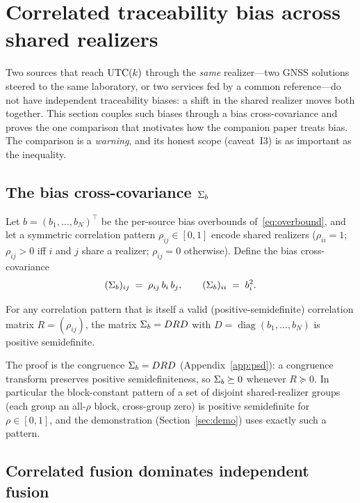 \section{Correlated traceability bias across shared realizers}
\label{sec:corr}

Two sources that reach $\mathrm{UTC}(k){}$ through the \emph{same} realizer---two GNSS
solutions steered to the same laboratory, or two services fed by a common
reference---do not have independent traceability biases: a shift in the shared
realizer moves both together. This section couples such biases through a bias
cross-covariance and proves the one comparison that motivates how the companion
paper treats bias. The comparison is a \emph{warning}, and its honest scope
(caveat~I3) is as important as the inequality.

\subsection{The bias cross-covariance $\Sigma_{b}{}$}
\label{sec:sigmab}

Let $b=(b_1,\dots,b_N)^{\!\top}$ be the per-source bias overbounds
of~\eqref{eq:overbound}, and let a symmetric correlation pattern
$\rho_{ij}\in[0,1]$ encode shared realizers ($\rho_{ii}=1$; $\rho_{ij}>0$ iff $i$
and $j$ share a realizer; $\rho_{ij}=0$ otherwise). Define the bias
cross-covariance
\begin{equation}
  (\Sigma_{b}{})_{ij} \;=\; \rho_{ij}\,b_i\,b_j,
  \qquad
  (\Sigma_{b}{})_{ii} \;=\; b_i^2 .
  \label{eq:sigmab}
\end{equation}

\begin{proposition}
\label{prop:psd}
For any correlation pattern that is itself a valid (positive-semidefinite)
correlation matrix $R=(\rho_{ij})$, the matrix $\Sigma_{b}{}=DRD$ with
$D=\operatorname{diag}(b_1,\dots,b_N)$ is positive semidefinite.
\end{proposition}

The proof is the congruence $\Sigma_{b}{}=DRD$ (Appendix~\ref{app:psd}): a congruence
transform preserves positive semidefiniteness, so $\Sigma_{b}{}\succeq0$ whenever
$R\succeq0$. In particular the block-constant pattern of a set of disjoint
shared-realizer groups (each group an all-$\rho$ block, cross-group zero) is
positive semidefinite for $\rho\in[0,1]$, and the demonstration
(Section~\ref{sec:demo}) uses exactly such a pattern.

\subsection{Correlated fusion dominates independent fusion}
\label{sec:corrthm}

